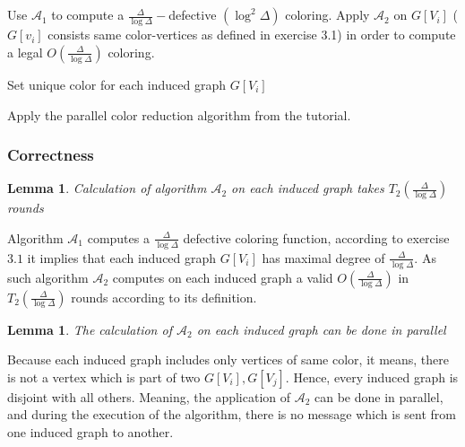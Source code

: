 \documentclass[11pt]{article}
\newtheorem{lemma}[theorem]{Lemma}
\begin{document}
\subsection{}

\begin{algorithmic}[1]
\State Use $\mathcal{A}_1$ to compute a $\frac{\Delta}{\log{\Delta}}-$defective $(\log^2{\Delta})$ coloring.
    \State Apply $\mathcal{A}_2$ on $G[V_i]$ ($G[v_i]$ consists same color-vertices as defined in exercise 3.1) in order to compute a legal $O(\frac{\Delta}{\log{\Delta}})$ coloring.
\EndFor

\State Set unique color for each induced graph $G[V_i]$


\State Apply the parallel color reduction algorithm from the tutorial.

\end{algorithmic}

\subsubsection*{Correctness}

\begin{lemma}
Calculation of algorithm $\mathcal{A}_2$ on each induced graph takes $T_2(\frac{\Delta}{\log{\Delta}})$ rounds
\end{lemma}
Algorithm $\mathcal{A}_1$ computes a $\frac{\Delta}{\log{\Delta}}$ defective coloring function, according to exercise $3.1$ it implies that each induced graph $G[V_i]$ has maximal degree of $\frac{\Delta}{\log{\Delta}}$. As such algorithm $\mathcal{A}_2$ computes on each induced graph a valid $O(\frac{\Delta}{\log{\Delta}})$ in $T_2(\frac{\Delta}{\log{\Delta}})$ rounds according to its definition.

\begin{lemma}
\label{A_2_parallel}
The calculation of $\mathcal{A}_2$ on each induced graph can be done in parallel
\end{lemma}
Because each induced graph includes only vertices of same color, it means, there is not a vertex which is part of two $G[V_i], G[V_j]$. Hence, every induced graph is disjoint with all others. Meaning, the application of $\mathcal{A}_2$ can be done in parallel, and during the execution of the algorithm, there is no message which is sent from one induced graph to another.
\end{document}
